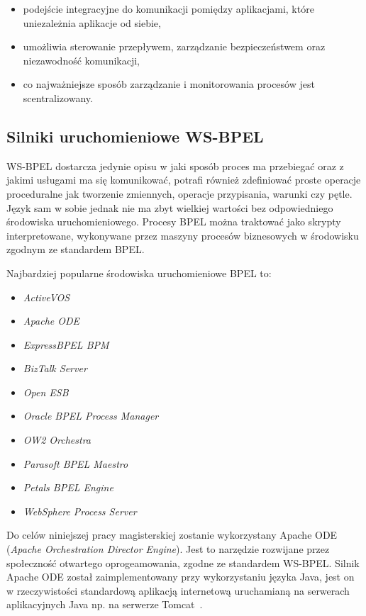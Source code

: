 \begin{itemize}
\item podejście integracyjne do komunikacji pomiędzy aplikacjami, które uniezależnia aplikacje od siebie,  
\item umożliwia sterowanie przepływem, zarządzanie bezpieczeństwem oraz niezawodność komunikacji,
\item co najważniejsze sposób zarządzanie i monitorowania procesów jest scentralizowany. 
\end{itemize}

\subsection{Silniki uruchomieniowe WS-BPEL}
\label{sec:bpelEngines}

WS-BPEL dostarcza jedynie opisu w jaki sposób proces ma przebiegać oraz z jakimi usługami ma się komunikować, potrafi również zdefiniować proste operacje proceduralne jak tworzenie zmiennych, operacje przypisania, warunki czy pętle. Język sam w sobie jednak nie ma zbyt wielkiej wartości bez odpowiedniego środowiska uruchomieniowego. Procesy BPEL można traktować jako skrypty interpretowane, wykonywane przez maszyny procesów biznesowych w środowisku zgodnym ze standardem BPEL. 

Najbardziej popularne środowiska uruchomieniowe BPEL to:

\begin{itemize}
\item \textit{ActiveVOS} 
\item \textit{Apache ODE}
\item \textit{ExpressBPEL BPM}
\item \textit{BizTalk Server}
\item \textit{Open ESB}
\item \textit{Oracle BPEL Process Manager}
\item \textit{OW2 Orchestra}
\item \textit{Parasoft BPEL Maestro}
\item \textit{Petals BPEL Engine}
\item \textit{WebSphere Process Server}
\end{itemize}

Do celów niniejszej pracy magisterskiej zostanie wykorzystany Apache ODE (\textit{Apache Orchestration Director Engine}). Jest to narzędzie rozwijane przez społeczność otwartego oprogeamowania, zgodne ze standardem WS-BPEL. Silnik Apache ODE został zaimplementowany przy wykorzystaniu języka Java, jest on w rzeczywistości standardową aplikacją internetową uruchamianą na serwerach aplikacyjnych Java np. na serwerze Tomcat~\cite{ode}. 


